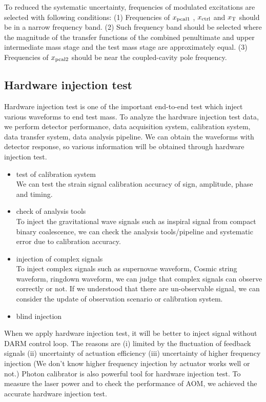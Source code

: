 To reduced the systematic uncertainty, frequencies of modulated excitations are selected with following conditions:
(1) Frequencies of $x_{\rm pcal1}$ , $x_{\rm ctrl}$ and $x_{\rm T}$ should be in a narrow frequency band.
(2) Such frequency band should be selected where the magnitude of the transfer functions of 
the combined penultimate and upper intermediate mass stage and the test mass stage are 
approximately equal.
(3) Frequencies of $x_{\rm pcal2}$ should be near the coupled-cavity pole frequency.


\subsection{Hardware injection test}
Hardware injection test is one of the important end-to-end test which 
inject various waveforms to end test mass.
To analyze the hardware injection test data, we perform 
detector performance, data acquisition system, calibration system, 
data transfer system, data analysis pipeline.
We can obtain the waveforms with detector response, so 
various information will be obtained through hardware injection test.
\begin{itemize}
\item test of calibration system\\
We can test the strain signal calibration accuracy of 
sign, amplitude, phase and timing.
\item check of analysis tools\\
To inject the gravitational wave signals such as inspiral signal from 
compact binary coalescence, we can check the analysis tools/pipeline 
and systematic error due to calibration accuracy.
\item injection of complex signals\\
To inject complex signals such as supernovae waveform, Cosmic string waveform, ringdown waveform, 
we can judge that complex signals can observe correctly or not. 
If we understood that there are un-observable signal, we can consider the update of observation scenario or
calibration system.
\item blind injection\\
\end{itemize}
When we apply hardware injection test, it will be better to inject signal without DARM control loop.
The reasons are (i) limited by the fluctuation of feedback signals (ii) uncertainty of actuation efficiency
(iii) uncertainty of higher frequency injection 
(We don't know higher frequency injection by actuator works well or not.)
Photon calibrator is also powerful tool for hardware injection test.
To measure the laser power and to check the performance of AOM, we achieved the accurate hardware injection test.

